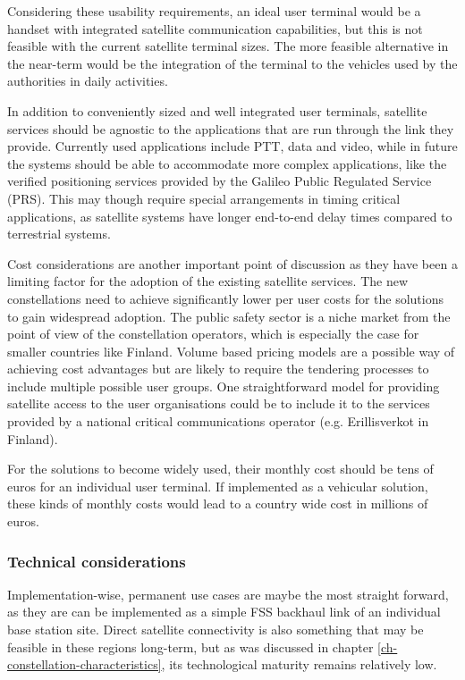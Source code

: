 \documentclass[english, 12pt, a4paper, elec, utf8, a-1b, online]{aaltothesis}
\begin{document}
Considering these usability requirements, an ideal user terminal would be a handset with integrated satellite communication capabilities, but this is not feasible with the current satellite terminal sizes. The more feasible alternative in the near-term would be the integration of the terminal to the vehicles used by the authorities in daily activities.

In addition to conveniently sized and well integrated user terminals, satellite services should be agnostic to the applications that are run through the link they provide. Currently used applications include PTT, data and video, while in future the systems should be able to accommodate more complex applications, like the verified positioning services provided by the Galileo Public Regulated Service (PRS). This may though require special arrangements in timing critical applications, as satellite systems have longer end-to-end delay times compared to terrestrial systems.

Cost considerations are another important point of discussion as they have been a limiting factor for the adoption of the existing satellite services. The new constellations need to achieve significantly lower per user costs for the solutions to gain widespread adoption. The public safety sector is a niche market from the point of view of the constellation operators, which is especially the case for smaller countries like Finland. Volume based pricing models are a possible way of achieving cost advantages but are likely to require the tendering processes to include multiple possible user groups. One straightforward model for providing satellite access to the user organisations could be to include it to the services provided by a national critical communications operator (e.g. Erillisverkot in Finland).

For the solutions to become widely used, their monthly cost should be tens of euros for an individual user terminal. If implemented as a vehicular solution, these kinds of monthly costs would lead to a country wide cost in millions of euros.

\subsubsection{Technical considerations}

Implementation-wise, permanent use cases are maybe the most straight forward, as they are can be implemented as a simple FSS backhaul link of an individual base station site. Direct satellite connectivity is also something that may be feasible in these regions long-term, but as was discussed in chapter \ref{ch-constellation-characteristics}, its technological maturity remains relatively low. 
\end{document}
